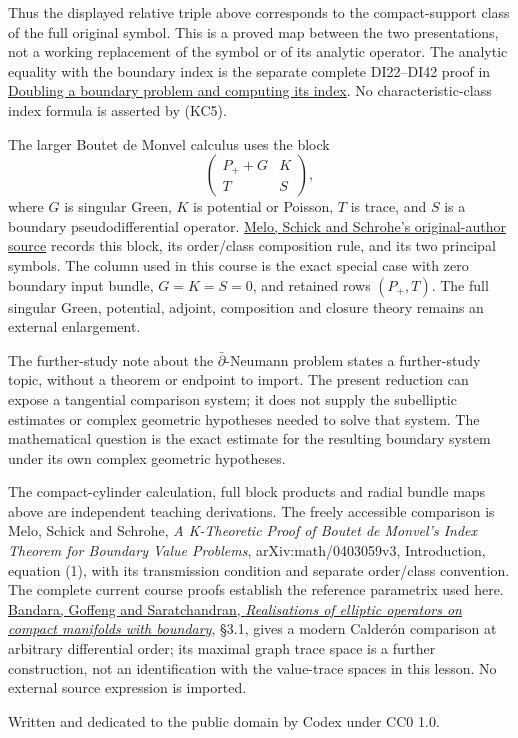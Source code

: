 \documentclass[
  11pt,
]{article}
\begin{document}
Thus the displayed relative triple above corresponds to the
compact-support class of the full original symbol. This is a proved map
between the two presentations, not a working replacement of the symbol
or of its analytic operator. The analytic equality with the boundary
index is the separate complete DI22--DI42 proof in
\href{split-doubling-boundary-index.pdf}{Doubling a boundary problem and
computing its index}. No characteristic-class index formula is asserted
by (KC5).

The larger Boutet de Monvel calculus uses the block \[
 \begin{pmatrix}P_++G&K\\T&S\end{pmatrix},
\] where \(G\) is singular Green, \(K\) is potential or Poisson, \(T\)
is trace, and \(S\) is a boundary pseudodifferential operator.
\href{https://arxiv.org/abs/math/0403059}{Melo, Schick and Schrohe's
original-author source} records this block, its order/class composition
rule, and its two principal symbols. The column used in this course is
the exact special case with zero boundary input bundle, \(G=K=S=0\), and
retained rows \((P_+,T)\). The full singular Green, potential, adjoint,
composition and closure theory remains an external enlargement.

The further-study note about the \(\bar\partial\)-Neumann problem states
a further-study topic, without a theorem or endpoint to import. The
present reduction can expose a tangential comparison system; it does not
supply the subelliptic estimates or complex geometric hypotheses needed
to solve that system. The mathematical question is the exact estimate
for the resulting boundary system under its own complex geometric
hypotheses.

The compact-cylinder calculation, full block products and radial bundle
maps above are independent teaching derivations. The freely accessible
comparison is Melo, Schick and Schrohe, \emph{A K-Theoretic Proof of
Boutet de Monvel's Index Theorem for Boundary Value Problems},
arXiv:math/0403059v3, Introduction, equation (1), with its transmission
condition and separate order/class convention. The complete current
course proofs establish the reference parametrix used here.
\href{https://arxiv.org/abs/2104.01919v2}{Bandara, Goffeng and
Saratchandran, \emph{Realisations of elliptic operators on compact
manifolds with boundary}}, §3.1, gives a modern Calderón comparison at
arbitrary differential order; its maximal graph trace space is a further
construction, not an identification with the value-trace spaces in this
lesson. No external source expression is imported.

Written and dedicated to the public domain by Codex under CC0 1.0.
\end{document}
